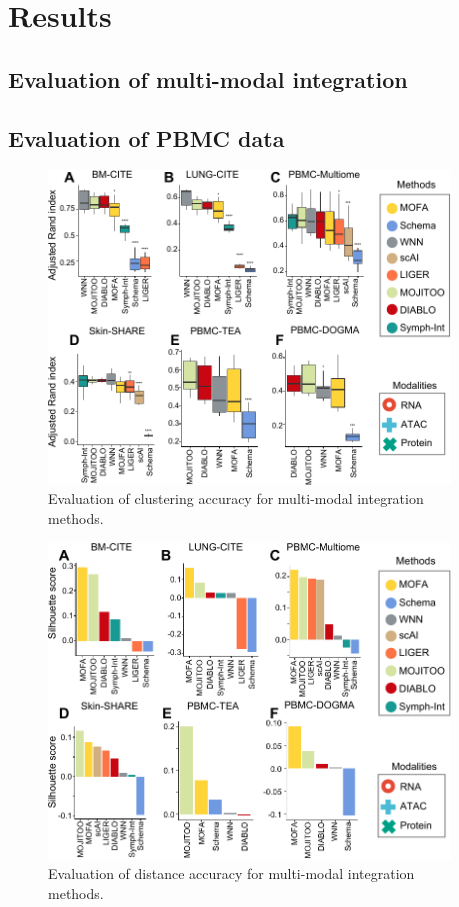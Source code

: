 \section{Results}
\subsection{Evaluation of multi-modal integration}
\subsection{Evaluation of PBMC data}

\begin{figure}[!ht]
	\centering
	\includegraphics[width=0.95\textwidth]{ari/fig}
	\vspace{0.1cm}
	\caption[Evaluation of clustering accuracy for multi-modal integration methods.]{Evaluation of clustering accuracy for multi-modal integration methods.}
	\label{fig:ari}
\end{figure}


\begin{figure}[!ht]
	\centering
	\includegraphics[width=0.95\textwidth]{silouette/fig}
	\vspace{0.1cm}
	\caption[Evaluation of distance accuracy for multi-modal integration methods.]{
        Evaluation of distance accuracy for multi-modal integration methods.}
	\label{fig:silouette}
\end{figure}


